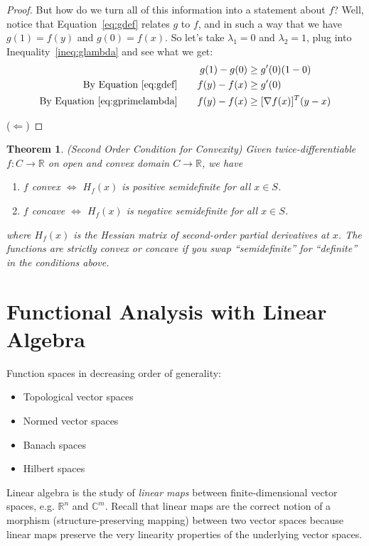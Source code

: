 \documentclass[12pt]{book}
\numberwithin{equation}{section} %
\theoremstyle{plain}
\newtheorem{thm}{Theorem}[section]
\theoremstyle{definition}
\theoremstyle{remark}
\newcommand{\R}{\mathbb{R}}
\newcommand{\Rn}{\mathbb{R}^n}
\newcommand{\C}{\mathbb{C}}
\begin{document}
\begin{proof}
But how do we turn all of this information into a statement about $f$?
Well, notice that Equation~\ref{eq:gdef} relates $g$ to $f$, and in such
a way that we have $g(1)=f(y)$ and $g(0)=f(x)$. So let's take
$\lambda_1=0$ and $\lambda_2=1$, plug into Inequality~\ref{ineq:glambda}
and see what we get:
\begin{align*}
  g(1) - g(0)
  &\geq g'(0)(1-0) \\
  \text{By Equation~\ref{eq:gdef}}\qquad
  f(y)-f(x)
  &\geq g'(0) \\
  \text{By Equation~\ref{eq:gprimelambda}}\qquad
  f(y)-f(x)
  &\geq [\nabla f(x)]^T (y-x) \\
\end{align*}

($\Leftarrow$)
\end{proof}

\begin{thm}{(Second Order Condition for Convexity)}
Given twice-differentiable $f:C\rightarrow\R$ on open and convex domain
$C\rightarrow\R$, we have
\begin{enumerate}
  \item $f$ convex $\iff$ $H_f(x)$ is positive semidefinite for all
    $x\in S$.
  \item $f$ concave $\iff$ $H_f(x)$ is negative semidefinite for all
    $x\in S$.
\end{enumerate}
where $H_f(x)$ is the Hessian matrix of second-order partial derivatives
at $x$. The functions are \emph{strictly} convex or concave if you
swap ``semidefinite'' for ``definite'' in the conditions above.
\end{thm}





\chapter{Functional Analysis with Linear Algebra}


Function spaces in decreasing order of generality:
\begin{itemize}
  \item Topological vector spaces
  \item Normed vector spaces
  \item Banach spaces
  \item Hilbert spaces
\end{itemize}

Linear algebra is the study of \emph{linear maps} between
finite-dimensional vector spaces, e.g. $\Rn$ and $\C^m$.
Recall that linear maps are the correct notion of a morphism
(structure-preserving mapping) between two vector spaces because linear
maps preserve the very linearity properties of the underlying vector
spaces.
\end{document}
